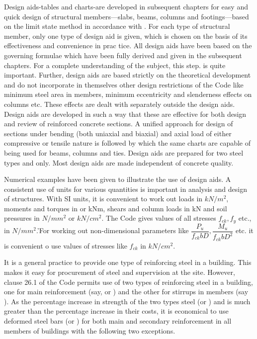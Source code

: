 Design aids-tables and charts-are developed in subsequent  chapters for
easy and quick design of structural members—slabs, beams, columns and footings—based
on the limit state method in accordance with . For each type of structural member, only
one type of design aid is given, which is chosen on the basis of its
effectiveness and convenience in prac tice. All design aids have been 
based on the governing formulae which have been fully derived and given
in the subsequent chapters. For a complete understanding of the subject,
this step. is quite important. Further, design aids are based strictly
on the theoretical development and do not incorporate in themselves other
design restrictions of the Code like minimum steel area in members, minimum
eccentricity and slenderness effects on columns etc. These effects are
dealt with separately outside the design aids. Design aids are developed
in such a way that these are effective for both design and review of
reinforced concrete sections. A unified approach for design of sections
under bending (both uniaxial and biaxial) and axial load of either
compressive or tensile nature is followed by which the same charts are
capable of being used for beams, columns and ties. Design aids are
prepared for two steel types {\fetwofivezero}  and {\fefouronefive} only.
Most design aids are made independent of concrete quality.

Numerical examples have been given to illustrate the use of design aids.
A consistent use of units for various quantities is important in analysis
and design of structures. With SI units, it is convenient to work out
loads in $kN/m^2$, moments and torques in or kNm, shears and column
loads in kN and soil pressures in $N/mm^2$ or $kN/cm^2$. The Code
gives values of all stresses $f_{ck}, f_y$ etc., in $N/mm^2$.'For working
out non-dimensional parameters like
$\dfrac{P_u}{f_{ck}bD},\dfrac{M_u}{f_{ck}bD^2}$ etc. it is convenient o
use  values of stresses like $f_{ck}$ in $kN/cm^2$.


It is a general practice to provide one type of reinforcing steel in a
building. This makes it easy for procurement of steel and supervision 
at the site. However, clause 26.1 of the Code permits use of two types
of reinforcing steel in a building, one for main reinforcement (say,
{\fefouronefive} or {\fefivezerozero}) and the other for stirrups in members
(say {\fetwofivezero}).
As the percentage increase in strength of the two types steel
\fefouronefive
(or {\fefivezerozero}) and {\fetwofivezero} is much greater than the percentage increase in
their costs, it is economical to use deformed steel bars
{\fefouronefive} (or \fefivezerozero) for both main and secondary
reinforcement in all members of buildings with the following two exceptions.

